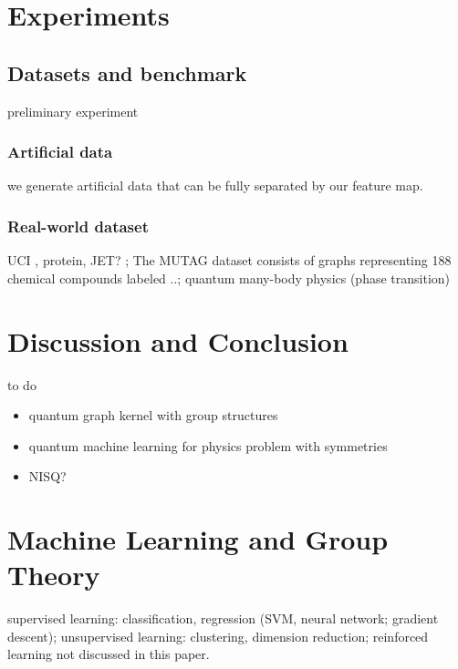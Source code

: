\section{Experiments}\label{sec:experiments}

\subsection{Datasets and benchmark}
preliminary experiment

\subsubsection{Artificial data}
we generate artificial data that can be fully separated by our feature map.

\subsubsection{Real-world dataset}
UCI \cite{kondorDiffusionKernelsGraphs2002}, protein, JET? \cite{bogatskiyLorentzGroupEquivariant2020}; 
The MUTAG dataset consists of graphs representing 188 chemical compounds labeled ..;
quantum many-body physics (phase transition)
\cite{carrasquillaMachineLearningPhases2017} 

\section{Discussion and Conclusion}\label{sec:discussion}
to do 
\begin{itemize}
	\item quantum graph kernel with group structures
	\item quantum machine learning for physics problem with symmetries
	\item NISQ?
\end{itemize}

\printbibliography
\appendix

\section{Machine Learning and Group Theory}
supervised learning: classification, regression
(SVM, neural network; gradient descent);
unsupervised learning: clustering, dimension reduction;
reinforced learning not discussed in this paper.
